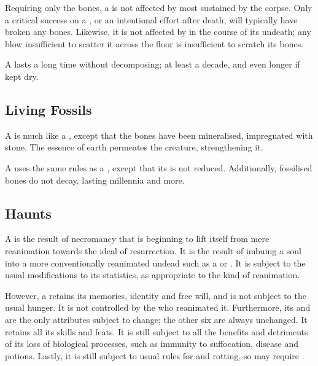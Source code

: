 Requiring only the bones, a  is not affected by most {\damage} sustained by the corpse.
Only a critical success on a {\damagetest}, or an intentional effort after death, will typically have broken any bones.
Likewise, it is not affected by {\damage} in the course of its undeath; any blow insufficient to scatter it across the floor is insufficient to scratch its bones.

A  lasts a long time without decomposing; at least a decade, and even longer if kept dry.

\subsection{Living Fossils}

A  is much like a , except that the bones have been mineralised, impregnated with stone.
The essence of earth permeates the creature, strengthening it.

A  uses the same rules as a , except that its  is not reduced.
Additionally, fossilised bones do not decay, lasting millennia and more.

\subsection{Haunts}

A  is the result of necromancy that is beginning to lift itself from mere reanimation towards the ideal of resurrection.
It is the result of imbuing a soul into a more conventionally reanimated undead such as a  or .
It is subject to the usual modifications to its statistics, as appropriate to the kind of reanimation.

However, a  retains its memories, identity and free will, and is not subject to the usual hunger.
It is not controlled by the  who reanimated it.
Furthermore, its  and  are the only attributes subject to change; the other six are always unchanged.
It retains all its skills and feats.
It is still subject to all the benefits and detriments of its loss of biological processes, such as immunity to suffocation, disease and potions.
Lastly, it is still subject to usual rules for {\damage} and rotting, so may require .

